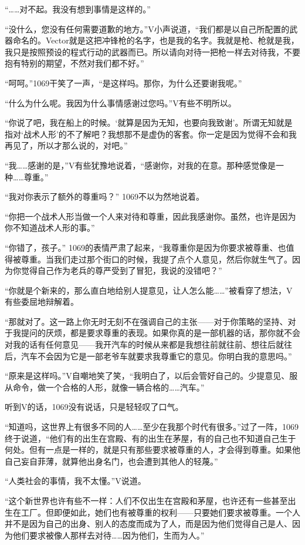 “……对不起。我没有想到事情是这样的。”

“没什么，您没有任何需要道歉的地方。”V小声说道，“我们都是以自己所配置的武器命名的。Vector就是这把冲锋枪的名字，也是我的名字。我就是枪、枪就是我，我只是按照预设的程式行动的武器而已。所以请向对待一把枪一样去对待我，不要抱有特别的期望，不然对我们都不好。”

“呵呵。”1069干笑了一声，“是这样吗。那你，为什么还要谢我呢。”

“什么为什么呢。我因为什么事情感谢过您吗。”V有些不明所以。

“你说了吧，我在船上的时候。‘就算是因为无知，也要向我致谢’。所谓无知就是指对‘战术人形’的不了解吧？我想那不是虚伪的客套。你一定是因为觉得不会和我再见了，所以才那么说的，对吧。”

“我……感谢的是，”V有些犹豫地说着，“感谢你，对我的在意。那种感觉像是一种……尊重。”

“我对你表示了额外的尊重吗？” 1069不以为然地说着。

“你把一个战术人形当做一个人来对待和尊重，因此我感谢你。虽然，也许是因为你不知道战术人形的事。”

“你错了，孩子。” 1069的表情严肃了起来，“我尊重你是因为你要求被尊重、也值得被尊重。当我们走过那个街口的时候，我提了点个人意见，然后你就生气了。因为你觉得自己作为老兵的尊严受到了冒犯，我说的没错吧？”

“你就是个新来的，那么直白地给别人提意见，让人怎么能……”被看穿了想法，V有些委屈地辩解着。

“那就对了。这一路上你无时无刻不在强调自己的主张——对于你策略的坚持、对于我提问的厌烦，都是要求尊重的表现。如果你真的是一部机器的话，那你就不会对我的话有任何意见——我开汽车的时候从来都是我想往前就往前、想往后就往后，汽车不会因为它是一部老爷车就要求我尊重它的意见。你明白我的意思吗。”

“原来是这样吗。”V自嘲地笑了笑，“我明白了，以后会管好自己的。少提意见、服从命令，做一个合格的人形，就像一辆合格的……汽车。”

听到V的话，1069没有说话，只是轻轻叹了口气。

“知道吗，这世界上有很多不同的人……至少在我那个时代有很多。”过了一阵，1069 终于说道，“他们有的出生在宫殿、有的出生在茅屋，有的自己也不知道自己生于何处。但有一点是一样的，就是只有那些要求被尊重的人，才会得到尊重。如果他自己妄自菲薄，就算他出身名门，也会遭到其他人的轻蔑。”

“人类社会的事情，我不太懂。”V说道。

“这个新世界也许有些不一样：人们不仅出生在宫殿和茅屋，也许还有一些甚至出生在工厂。但即便如此，她们也有被尊重的权利——只要她们要求被尊重。一个人并不是因为自己的出身、别人的态度而成为了人，而是因为他们觉得自己是人、因为他们要求被像人那样去对待……因为他们，生而为人。”

